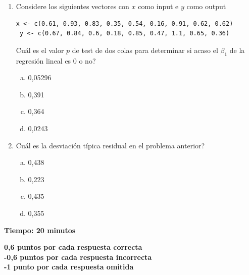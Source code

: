 \documentclass[11pt,oneside,spanish]{article}
\theoremstyle{definition}
\theoremstyle{definition}\newtheorem{definicion}{Definicin}
\theoremstyle{definition}\newtheorem{ejemplo}{Ejemplo}
\theoremstyle{remark}\newtheorem{nota}{\textsc{Nota}}
\theoremstyle{definition}\newtheorem{proposicion}{Proposicin}
\theoremstyle{definition}\newtheorem{problema}{Problema}
\begin{document}
\begin{enumerate}[(1)]
\newpage

\item Considere los siguientes vectores con $x$ como input e $y$ como output
\begin{lstlisting}[backgroundcolor=\color{Gray!20},frame=none,basicstyle=\ttfamily]
 x <- c(0.61, 0.93, 0.83, 0.35, 0.54, 0.16, 0.91, 0.62, 0.62)
 y <- c(0.67, 0.84, 0.6, 0.18, 0.85, 0.47, 1.1, 0.65, 0.36)
\end{lstlisting}
{\textquestiondown}Cu\'al es el valor $p$ de test de dos colas para determinar si acaso el $\beta_1$ de la regresi\'on lineal es 0 o no?
	\begin{enumerate}[(a)]
	\item 0,05296
	\item 0,391
	\item 0,364
	\item 0,0243
	\end{enumerate}
	
\item {\textquestiondown}Cu\'al es la desviaci\'on t\'ipica residual en el problema anterior?
	\begin{enumerate}[(a)]
	\item 0,438
	\item 0,223
	\item 0,435
	\item 0,355
	\end{enumerate}	

\end{enumerate}

\bigskip

\textbf{Tiempo: 20 minutos}

\medskip

\textbf{0,6 puntos por cada respuesta correcta}\\
\textbf{-0,6 puntos por cada respuesta incorrecta}\\
\textbf{-1 punto por cada respuesta omitida}
\end{document}
